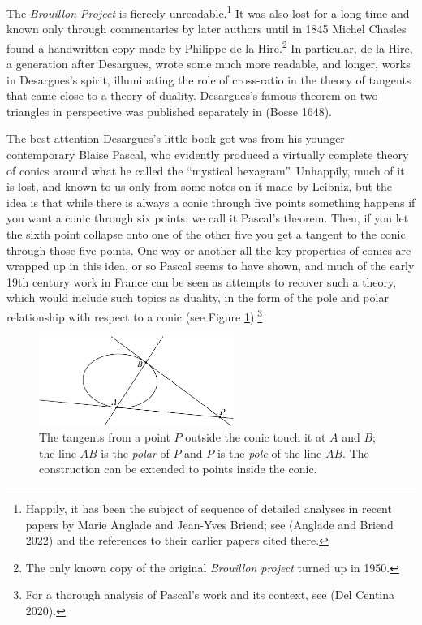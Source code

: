 The  \emph{Brouillon Project} is fiercely unreadable.\footnote{Happily, it has been the subject of sequence of detailed analyses in recent papers by Marie  Anglade and Jean-Yves Briend; see (Anglade and Briend 2022) and the references to their earlier papers cited there.} It was also lost for a long time and known only through commentaries by later authors until in 1845 Michel Chasles found a handwritten copy made by Philippe de la Hire.\footnote{The only known copy of the original \emph{Brouillon project} turned up in 1950.} In particular, de la Hire, a generation after Desargues, wrote some much more readable, and longer, works in Desargues's spirit, illuminating the role of cross-ratio in the theory of tangents that came close to a theory of duality. Desargues's famous theorem on two triangles in perspective was published separately in (Bosse 1648).

The best attention Desargues's little book got was from his younger contemporary Blaise Pascal, who evidently produced a virtually complete theory of conics around what he called the ``mystical hexagram''. Unhappily, much of it is lost, and known to us only from some notes on it made by Leibniz, but the idea is that while there is always a conic through five points something happens if you want a conic through six points: we call it Pascal's theorem. Then, if you let the sixth point collapse onto one of the other five you get a tangent to the conic through those five points. One way or another all the key properties of conics are wrapped up in this idea, or so Pascal seems to have shown, and much of the early 19th century work in France can be seen as attempts to recover such a theory, which would include such topics as duality, in the form of the pole and polar relationship with respect to a conic (see Figure \ref{figpolepolar}).\footnote{For a thorough analysis of Pascal's work and its context, see (Del Centina 2020).} 

\begin{figure}
\includegraphics[width=180pt]{main/poleandpolar} 
\caption{The tangents from a point $P$ outside the conic touch it at
  $A$ and $B$; the line $AB$ is the \emph{polar} of $P$ and $P$ is the
  \emph{pole} of the line $AB$. The construction can be extended to
  points inside the conic.} 
      \label{figpolepolar}
\end{figure}

